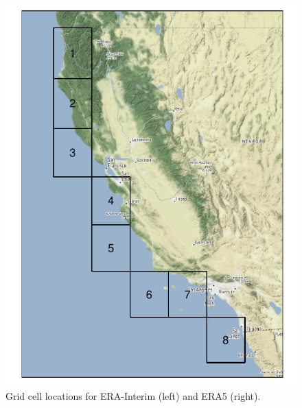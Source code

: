 \documentclass[iicol,sn-basic]{sn-jnl}
\theoremstyle{thmstyleone}
\begin{document}
\begin{figure}[tb]
\caption{Grid cell locations for ERA-Interim (left) and ERA5 (right).\label{fig:gridlocs}}
\centering
\begin{minipage}{0.25\textwidth}
\centering
\includegraphics[width=0.99\linewidth]{./images/erai_grid}
\end{minipage}%
\begin{minipage}{0.25\textwidth}
\centering

\end{minipage}
\end{figure}
\end{document}
